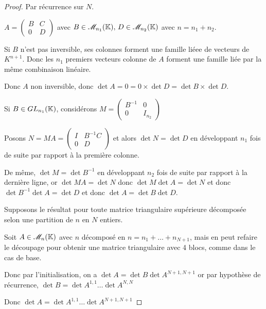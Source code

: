 \begin{proof}
    Par récurrence sur $N$. 


    $A = \begin{pmatrix}
        B & C \\
        0 & D 
    \end{pmatrix}$ avec $B \in \mathscr M_{n_1}(\mathbb{K}), \, D \in \mathscr M_{n_2}(\mathbb{K})$ avec $ n = n_1 + n_2$. 

    Si $B$ n'est pas inversible, ses colonnes forment une famille liéee de vecteurs de $K^{n + 1}$. Donc les 
    $n_1$ premiers vecteurs colonne de $A$ forment une famille liée par la même combinaison linéaire. 

    Donc $A$ non inversible, donc $\det A = 0 = 0 \times \det D = \det B \times \det D$. 

    \avspace Si $B \in GL_{n_1}(\mathbb{K})$, considérons $M = \begin{pmatrix}
        B^{-1} & 0 \\
        0 & I_{n_2}
    \end{pmatrix}$

    Posons $N = MA = \begin{pmatrix}
        I & B^{-1}C \\
        0 & D 
    \end{pmatrix}$ et alors $\det N = \det D$ en développant $n_1$ fois de suite par rapport à la première colonne. 

    De même, $\det M = \det B^{-1}$ en développant $n_2$ fois de suite par rapport à la dernière ligne, or 
    $\det MA = \det N$ donc $\det M \det A = \det N$ et donc $\det B^{-1} \det A = \det D$ 
    et donc $\det A = \det B \det D$. 

    Supposons le résultat pour toute matrice triangulaire supérieure décomposée selon une partition de $n$ en $N$ entiers. 

    Soit $A \in \mathscr M_n(\mathbb{K})$ avec $n$ décomposé en $n = n_1 + \dots + n_{N + 1}$, mais en 
    peut refaire le découpage pour obtenir une matrice triangulaire avec 4 blocs, comme dans le cas de base. 

    Donc par l'initialisation, on a $\det A = \det B \det A^{N + 1, N + 1}$ or par hypothèse de récurrence, 
    $\det B = \det A^{1, 1} \dots \det A^{N, N}$

    Donc $\det A = \det A^{1, 1} \dots \det A^{N + 1, N + 1}$
\end{proof}